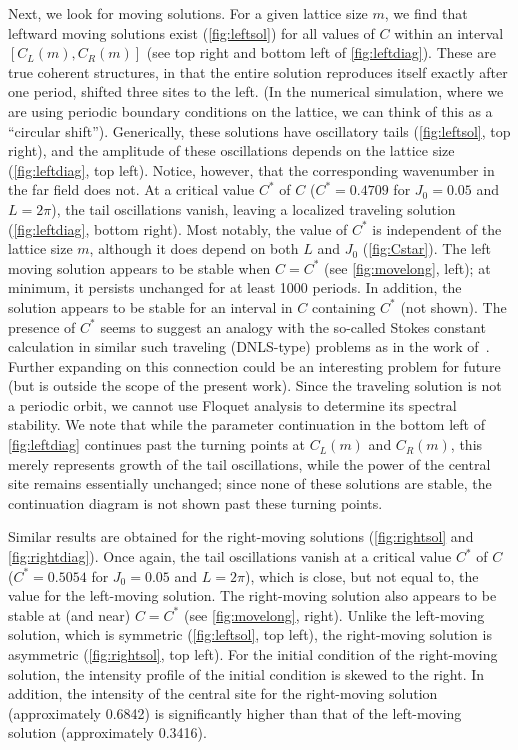 \documentclass[reprint, amsmath,amssymb,aps,pre]{revtex4-2}
\begin{document}
Next, we look for moving solutions. For a given lattice size $m$, we find that leftward moving solutions exist (\cref{fig:leftsol}) for all values of $C$ within an interval $[C_L(m), C_R(m)]$ (see top right and bottom left of \cref{fig:leftdiag}).
These are true coherent structures, in that the entire solution reproduces itself exactly after one period, shifted three sites to the left. (In the numerical simulation, where we are using periodic boundary conditions on the lattice, we can think of this as a ``circular shift''). Generically, these solutions have oscillatory tails (\cref{fig:leftsol}, top right), and the amplitude of these oscillations depends on the lattice size (\cref{fig:leftdiag}, top left). 
Notice, however, that the corresponding wavenumber in the far field does not.
At a critical value $C^*$ of $C$ ($C^* = 0.4709$ for $J_0 = 0.05$ and $L=2\pi$), the tail oscillations vanish, leaving a localized traveling solution (\cref{fig:leftdiag}, bottom right). Most notably, the value of $C^*$ is independent of the lattice size $m$, although it does depend on both $L$ and $J_0$ (\cref{fig:Cstar}). The left moving solution appears to be stable when $C=C^*$ (see \cref{fig:movelong}, left); at minimum, it persists unchanged for at least 1000 periods. In addition, the solution appears to be stable for an interval in $C$ containing $C^*$ (not shown). 
The presence of $C^*$ seems to suggest an analogy with the so-called Stokes
constant calculation in similar such traveling (DNLS-type) problems as in the
work of~\cite{igorb}. Further expanding on this connection could be an 
interesting problem for future (but is outside the scope of the present work).
Since the traveling solution is not a periodic orbit, we cannot use Floquet analysis to determine its spectral stability. %
We note that while the parameter continuation in the bottom left of \cref{fig:leftdiag} continues past the turning points at $C_L(m)$ and $C_R(m)$, this merely represents growth of the tail oscillations, while the power of the central site remains essentially unchanged; since none of these solutions are stable, the continuation diagram is not shown past these turning points. %

Similar results are obtained for the right-moving solutions (\cref{fig:rightsol} and \cref{fig:rightdiag}). Once again, the tail oscillations vanish at a critical value $C^*$ of $C$ ($C^* = 0.5054$ for $J_0 = 0.05$ and $L=2\pi$), which is close, but not equal to, the value for the left-moving solution. The right-moving solution also appears to be stable at (and near) $C=C^*$ (see \cref{fig:movelong}, right). Unlike the left-moving solution, which is symmetric (\cref{fig:leftsol}, top left), the right-moving solution is asymmetric (\cref{fig:rightsol}, top left). For the initial condition of the right-moving solution, the intensity profile of the initial condition is skewed to the right. In addition, the
intensity of the central site for the right-moving solution (approximately 0.6842) is significantly higher than that of the left-moving solution (approximately 0.3416).
\end{document}
